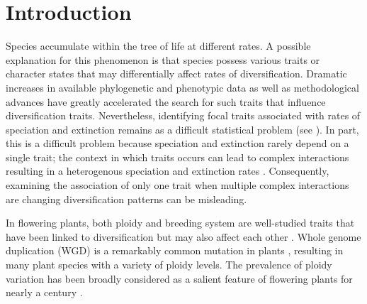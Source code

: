 \section{Introduction}


Species accumulate within the tree of life at different rates.
A possible explanation for this phenomenon is that species possess various traits or character states that may differentially affect rates of diversification. %
Dramatic increases in available phylogenetic and phenotypic data %
as well as methodological advances %
have greatly accelerated the search for such traits that influence diversification traits.
Nevertheless, identifying focal traits associated with rates of speciation and extinction remains as a difficult statistical problem (see \citep{maddison_2015, rabosky_2015, moore_2016, fitzjohn_2009, goldberg_2012, beaulieu_2016, rabosky_2017}). %
In part, this is a difficult problem because speciation and extinction rarely depend on a single trait; the context in which traits occurs can lead to complex interactions resulting in a heterogenous speciation and extinction rates \citep{beaulieu_2016, caetano_2018, herrera_2018}.
Consequently, examining the association of only one trait when multiple complex interactions are changing diversification patterns can be misleading.

In flowering plants, both ploidy and breeding system are well-studied traits that have been linked to diversification but may also affect each other \citep{stebbins1950}. 
Whole genome duplication (WGD) is a remarkably common mutation in plants \citep{husband_2013, zenilferguson_2017}, resulting in many plant species with a variety of ploidy levels. The prevalence of ploidy variation has been broadly considered as a salient feature of flowering plants for nearly a century \citep{stebbins1938}. 

